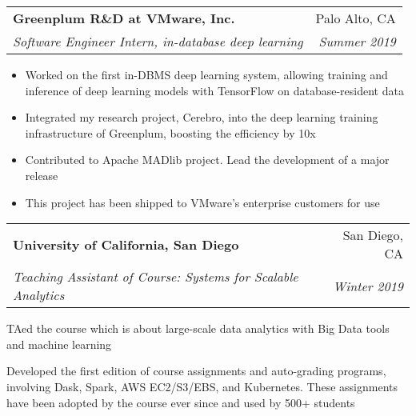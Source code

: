 \documentclass[letterpaper,11pt]{article}
\makeatletter
\newcommand{\resumeItem}[2]{
  \item\small{
    \textbf{#1}{: #2 \vspace{-2pt}}
  }
}
\newcommand{\resumeSubheading}[4]{
  \vspace{-1pt}\item
    \begin{tabular*}{0.97\textwidth}[t]{l@{\extracolsep{\fill}}r}
      \textbf{#1} & #2 \\
      \textit{\small#3} & \textit{\small #4}
    \end{tabular*}\vspace{-5pt}
}
\newcommand{\resumeItemListStart}{\begin{itemize}}
\newcommand{\resumeItemListEnd}{\end{itemize}\vspace{-5pt}}
\makeatother
\begin{document}
    \resumeSubheading
      {Greenplum R\&D at VMware, Inc.}{Palo Alto, CA}
      {Software Engineer Intern, in-database deep learning}{Summer 2019}
      \resumeItemListStart
       \item {\small Worked on the first in-DBMS deep learning system, allowing training and inference of deep learning models with TensorFlow on database-resident data \vspace{-2pt}}
       \item {\small Integrated my research project, Cerebro, into the deep learning training infrastructure of Greenplum, boosting the efficiency by 10x \vspace{-2pt}}
       \item {\small Contributed to Apache MADlib project. Lead the development of a major release}\vspace{-2pt}
       \item This project has been shipped to VMware's enterprise customers for use\vspace{-2pt}
      \resumeItemListEnd
      
      
      
    \resumeSubheading
      {University of California, San Diego}{San Diego, CA}
      {Teaching Assistant of Course: Systems for Scalable Analytics}{Winter 2019}
      \resumeItemListStart
      {\small
        \item TAed the course which is about large-scale data analytics with Big Data tools and machine learning  \vspace{-2pt}
       \item Developed the first edition of course assignments and auto-grading programs, involving Dask, Spark, AWS EC2/S3/EBS, and Kubernetes. These assignments have been adopted by the course ever since and used by 500+ students \vspace{-2pt}
       }
      \resumeItemListEnd



\end{document}
